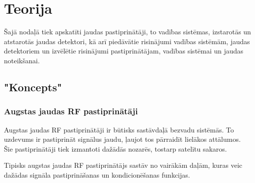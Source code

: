 \chapter{Teorija}

Šajā nodaļā tiek apskatīti jaudas pastiprinātāji, to vadības sistēmas, izstarotās un atstarotās jaudas detektori, kā arī piedāvātie risinājumi vadības sistēmām, jaudas detektoriem un izvēlētie risinājumi pastiprinātājam, vadības sistēmai un jaudas noteikšanai.

\section{"Koncepts"}
\subsection{Augstas jaudas RF pastiprinātāji}
Augstas jaudas RF pastiprinātāji ir būtisks sastāvdaļā bezvadu sistēmās. To uzdevums ir pastiprināt signālus jaudu, ļaujot tos pārraidīt lielākos attālumos. Šie pastiprinātāji tiek izmantoti dažādās nozarēs, tostarp satelītu sakaros.

Tipisks augstas jaudas RF pastiprinātājs sastāv no vairākām daļām, kuras veic dažādas signāla pastiprināšanas un kondicionēšanas funkcijas. 

